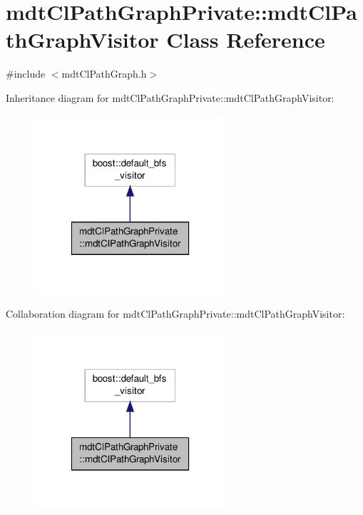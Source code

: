 \hypertarget{classmdt_cl_path_graph_private_1_1mdt_cl_path_graph_visitor}{\section{mdt\-Cl\-Path\-Graph\-Private\-:\-:mdt\-Cl\-Path\-Graph\-Visitor Class Reference}
\label{classmdt_cl_path_graph_private_1_1mdt_cl_path_graph_visitor}
}


{\ttfamily \#include $<$mdt\-Cl\-Path\-Graph.\-h$>$}



Inheritance diagram for mdt\-Cl\-Path\-Graph\-Private\-:\-:mdt\-Cl\-Path\-Graph\-Visitor\-:\nopagebreak
\begin{figure}[H]
\begin{center}
\leavevmode
\includegraphics[width=202pt]{classmdt_cl_path_graph_private_1_1mdt_cl_path_graph_visitor__inherit__graph}
\end{center}
\end{figure}


Collaboration diagram for mdt\-Cl\-Path\-Graph\-Private\-:\-:mdt\-Cl\-Path\-Graph\-Visitor\-:\nopagebreak
\begin{figure}[H]
\begin{center}
\leavevmode
\includegraphics[width=202pt]{classmdt_cl_path_graph_private_1_1mdt_cl_path_graph_visitor__coll__graph}
\end{center}
\end{figure}
